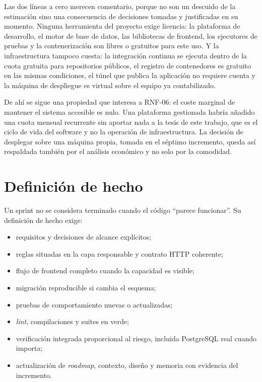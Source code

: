 Las dos líneas a cero merecen comentario, porque no son un descuido de la estimación sino una consecuencia de decisiones tomadas y justificadas en su momento. Ninguna herramienta del proyecto exige licencia: la plataforma de desarrollo, el motor de base de datos, las bibliotecas de frontend, los ejecutores de pruebas y la contenerización son libres o gratuitos para este uso. Y la infraestructura tampoco cuesta: la integración continua se ejecuta dentro de la cuota gratuita para repositorios públicos, el registro de contenedores es gratuito en las mismas condiciones, el túnel que publica la aplicación no requiere cuenta y la máquina de despliegue es virtual sobre el equipo ya contabilizado.

De ahí se sigue una propiedad que interesa a RNF-06: el coste marginal de mantener el sistema accesible es nulo. Una plataforma gestionada habría añadido una cuota mensual recurrente sin aportar nada a la tesis de este trabajo, que es el ciclo de vida del software y no la operación de infraestructura. La decisión de desplegar sobre una máquina propia, tomada en el séptimo incremento, queda así respaldada también por el análisis económico y no solo por la comodidad.

\section{Definición de hecho}

Un sprint no se considera terminado cuando el código ``parece funcionar''. Su definición de hecho exige:

\begin{itemize}
  \item requisitos y decisiones de alcance explícitos;
  \item reglas situadas en la capa responsable y contrato HTTP coherente;
  \item flujo de frontend completo cuando la capacidad es visible;
  \item migración reproducible si cambia el esquema;
  \item pruebas de comportamiento nuevas o actualizadas;
  \item \emph{lint}, compilaciones y suites en verde;
  \item verificación integrada proporcional al riesgo, incluida PostgreSQL real cuando importa;
  \item actualización de \emph{roadmap}, contexto, diseño y memoria con evidencia del incremento.
\end{itemize}

